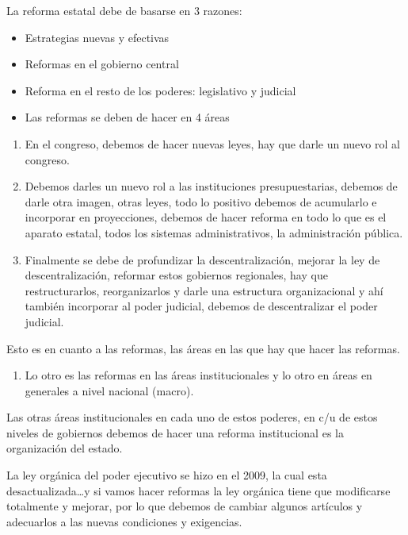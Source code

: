 \documentclass[
  letterpaper,
  DIV=11,
  numbers=noendperiod]{scrartcl}
\providecommand{\tightlist}{%
  \setlength{\itemsep}{0pt}\setlength{\parskip}{0pt}}\usepackage{longtable,booktabs,array}
\begin{document}
La reforma estatal debe de basarse en 3 razones:

\begin{itemize}
\tightlist
\item
  Estrategias nuevas y efectivas
\item
  Reformas en el gobierno central
\item
  Reforma en el resto de los poderes: legislativo y judicial
\item
  Las reformas se deben de hacer en 4 áreas
\end{itemize}

\begin{enumerate}
\def\labelenumi{\arabic{enumi}.}
\tightlist
\item
  En el congreso, debemos de hacer nuevas leyes, hay que darle un nuevo
  rol al congreso.
\item
  Debemos darles un nuevo rol a las instituciones presupuestarias,
  debemos de darle otra imagen, otras leyes, todo lo positivo debemos de
  acumularlo e incorporar en proyecciones, debemos de hacer reforma en
  todo lo que es el aparato estatal, todos los sistemas administrativos,
  la administración pública.
\item
  Finalmente se debe de profundizar la descentralización, mejorar la ley
  de descentralización, reformar estos gobiernos regionales, hay que
  restructurarlos, reorganizarlos y darle una estructura organizacional
  y ahí también incorporar al poder judicial, debemos de descentralizar
  el poder judicial.
\end{enumerate}

Esto es en cuanto a las reformas, las áreas en las que hay que hacer las
reformas.

\begin{enumerate}
\def\labelenumi{\arabic{enumi}.}
\setcounter{enumi}{3}
\tightlist
\item
  Lo otro es las reformas en las áreas institucionales y lo otro en
  áreas en generales a nivel nacional (macro).
\end{enumerate}

Las otras áreas institucionales en cada uno de estos poderes, en c/u de
estos niveles de gobiernos debemos de hacer una reforma institucional es
la organización del estado.

La ley orgánica del poder ejecutivo se hizo en el 2009, la cual esta
desactualizada\ldots y si vamos hacer reformas la ley orgánica tiene que
modificarse totalmente y mejorar, por lo que debemos de cambiar algunos
artículos y adecuarlos a las nuevas condiciones y exigencias.
\end{document}
